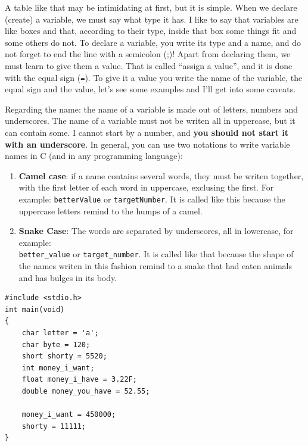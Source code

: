 \documentclass[a4paper]{article}
\begin{document}
A table like that may be intimidating at first, but it is simple. When we
declare (create) a variable, we must say what type it has. I like to say that
variables are like boxes and that, according to their type, inside that box
some things fit and some others do not. To declare a variable, you write its
type and a name, and do not forget to end the line with a semicolon (;)! Apart
from declaring them, we must learn to give them a value. That is called ``assign
a value'', and it is done with the equal sign (\verb!=!). To give it a value you
write the name of the variable, the equal sign and the value, let's see some
examples and I'll get into some caveats.

Regarding the name: the name of a variable is made out of letters, numbers and
underscores. The name of a variable must not be writen all in uppercase, but
it can contain some. I cannot start by a number, and \textbf{you should not start
it with an underscore}. In general, you can use two notations to write variable
names in C (and in any programming language):
\begin{enumerate}
    \item \textbf{Camel case}: if a name contains several words, they must be
    writen together, with the first letter of each word in uppercase,
    exclusing the first. For example: \verb!betterValue! or \verb!targetNumber!.
    It is called like this
    because the uppercase letters remind to the humps of a camel.
    \item \textbf{Snake Case}: The words are separated by underscores, all in
    lowercase, for example: \\ \verb!better_value! or \verb!target_number!. It is
    called like that because the shape of the names writen in this fashion
    remind to a snake that had eaten animals and has bulges in its body.
\end{enumerate}


\noindent
\begin{minipage}[H]{\linewidth}
\mbox{}
\begin{lstlisting}[style=C, caption={Declaration and assignment of variables},
label={lst:variableAsignation}]
#include <stdio.h>
int main(void)
{
    char letter = 'a';
    char byte = 120;
    short shorty = 5520;
    int money_i_want;
    float money_i_have = 3.22F;
    double money_you_have = 52.55;

    money_i_want = 450000;
    shorty = 11111;
}
\end{lstlisting}
\end{minipage}
\end{document}
